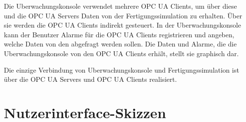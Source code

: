 \documentclass[parskip=full]{scrartcl}
\begin{document}
Die \gls{Uberwachungskonsole} verwendet mehrere \glspl{OPC UA Client}, um \"uber diese und die \glspl{OPC UA Server} Daten von der
\gls{Fertigungssimulation} zu erhalten. \"Uber sie werden die \glspl{OPC UA Client} indirekt gesteuert. In der \gls{Uberwachungskonsole} kann der Benutzer Alarme
f\"ur die \glspl{OPC UA Client} registrieren und angeben, welche Daten von den  abgefragt werden sollen. Die Daten und Alarme, die
die \gls{Uberwachungskonsole} von den \glspl{OPC UA Client} erh\"alt, stellt sie graphisch dar.

Die einzige Verbindung von \gls{Uberwachungskonsole} und \gls{Fertigungssimulation} ist \"uber die \glspl{OPC UA Server} und \glspl{OPC UA Client} realisiert.

\section{Nutzerinterface-Skizzen}
\end{document}
